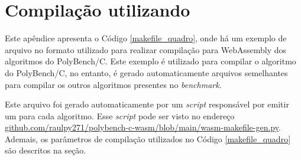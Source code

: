 \chapter{Compilação utilizando }\label{makefile}

Este apêndice apresenta o Código \ref{makefile_quadro}, onde há um exemplo de arquivo no formato  utilizado para realizar compilação para WebAssembly dos algoritmos do PolyBench/C. Este exemplo é utilizado para compilar o algoritmo  do PolyBench/C, no entanto, é gerado automaticamente arquivos semelhantes para compilar os outros algoritmos presentes no \textit{benchmark}.

Este arquivo foi gerado automaticamente por um \textit{script} responsável por emitir um  para cada algoritmo. Esse \textit{script} pode ser visto no endereço \href{https://github.com/raulpy271/polybench-c-wasm/blob/main/wasm-makefile-gen.py}{github.com/raulpy271/polybench-c-wasm/blob/main/wasm-makefile-gen.py}. Ademais, os parâmetros de compilação utilizados no Código \ref{makefile_quadro} são descritos na seção.

